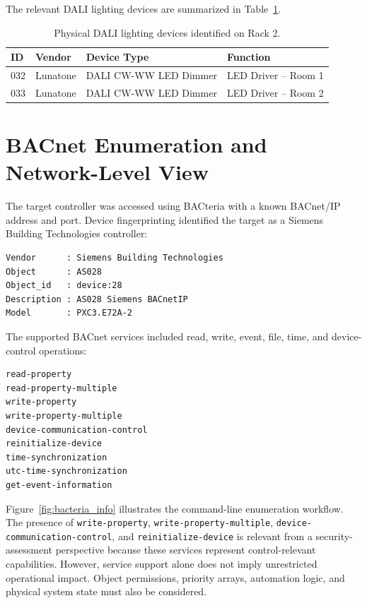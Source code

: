 \documentclass[10pt,conference]{IEEEtran}
\begin{document}
The relevant DALI lighting devices are summarized in Table~\ref{tab:dali_devices}.

\begin{table}[h]
\centering
\caption{Physical DALI lighting devices identified on Rack 2.}
\label{tab:dali_devices}
\begin{tabular}{llll}
\toprule
ID & Vendor & Device Type & Function \\
\midrule
032 & Lunatone & DALI CW-WW LED Dimmer & LED Driver -- Room 1 \\
033 & Lunatone & DALI CW-WW LED Dimmer & LED Driver -- Room 2 \\
\bottomrule
\end{tabular}
\end{table}

\section{BACnet Enumeration and Network-Level View}

The target controller was accessed using BACteria with a known BACnet/IP address and port. Device fingerprinting identified the target as a Siemens Building Technologies controller:

\begin{lstlisting}[style=terminal,caption={BACteria device fingerprint excerpt.}]
Vendor      : Siemens Building Technologies
Object      : AS028
Object_id   : device:28
Description : AS028 Siemens BACnetIP
Model       : PXC3.E72A-2
\end{lstlisting}

The supported BACnet services included read, write, event, file, time, and device-control operations:

\begin{lstlisting}[style=terminal,caption={Selected supported BACnet services.}]
read-property
read-property-multiple
write-property
write-property-multiple
device-communication-control
reinitialize-device
time-synchronization
utc-time-synchronization
get-event-information
\end{lstlisting}

Figure~\ref{fig:bacteria_info} illustrates the command-line enumeration workflow. The presence of \texttt{write-property}, \texttt{write-property-multiple}, \texttt{device-communication-control}, and \texttt{reinitialize-device} is relevant from a security-assessment perspective because these services represent control-relevant capabilities. However, service support alone does not imply unrestricted operational impact. Object permissions, priority arrays, automation logic, and physical system state must also be considered.
\end{document}
